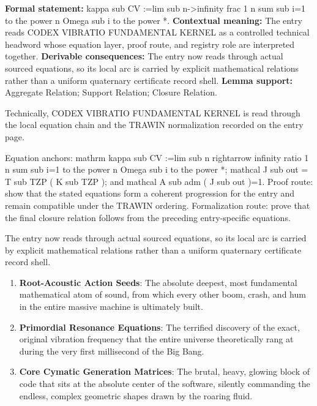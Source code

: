 \begingroup\footnotesize\setlength{\emergencystretch}{3em}\sloppy
\textbf{Formal statement:} kappa sub CV :=lim sub n->infinity frac 1 n sum sub i=1 to the power n Omega sub i to the power *. \textbf{Contextual meaning:} The entry reads CODEX VIBRATIO FUNDAMENTAL KERNEL as a controlled technical headword whose equation layer, proof route, and registry role are interpreted together. \textbf{Derivable consequences:} The entry now reads through actual sourced equations, so its local arc is carried by explicit mathematical relations rather than a uniform quaternary certificate record shell. \textbf{Lemma support:} Aggregate Relation; Support Relation; Closure Relation.\par
\endgroup

Technically, CODEX VIBRATIO FUNDAMENTAL KERNEL is read through the local equation chain and the TRAWIN normalization recorded on the entry page.

Equation anchors: mathrm kappa sub CV :=lim sub n rightarrow infinity ratio 1 n sum sub i=1 to the power n Omega sub i to the power *; mathcal J sub out = T sub TZP ( K sub TZP ); and mathcal A sub adm ( J sub out )=1. Proof route: show that the stated equations form a coherent progression for the entry and remain compatible under the TRAWIN ordering. Formalization route: prove that the final closure relation follows from the preceding entry-specific equations.

The entry now reads through actual sourced equations, so its local arc is carried by explicit mathematical relations rather than a uniform quaternary certificate record shell.
\endgroup

\begin{enumerate}[leftmargin=1.6em,itemsep=6pt,topsep=4pt]
\item \textbf{Root-Acoustic Action Seeds}: The absolute deepest, most fundamental mathematical atom of sound, from which every other boom, crash, and hum in the entire massive machine is ultimately built.
\item \textbf{Primordial Resonance Equations}: The terrified discovery of the exact, original vibration frequency that the entire universe theoretically rang at during the very first millisecond of the Big Bang.
\item \textbf{Core Cymatic Generation Matrices}: The brutal, heavy, glowing block of code that sits at the absolute center of the software, silently commanding the endless, complex geometric shapes drawn by the roaring fluid.
\end{enumerate}

